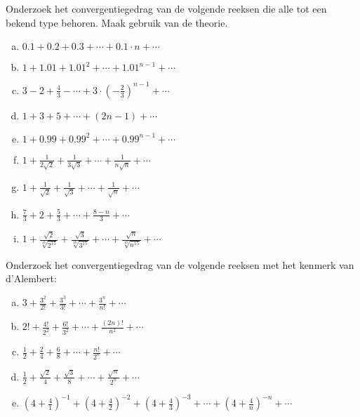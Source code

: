 \documentclass[12pt,twoside]{article}
\begin{document}
\begin{oefening}
Onderzoek het convergentiegedrag van de volgende reeksen die alle tot een bekend type behoren. Maak gebruik van de theorie.
\begin{enumerate}[(a)]
  \item $0.1 + 0.2 + 0.3 + \cdots + 0.1\cdot n + \cdots$
  \item $1 + 1.01 + 1.01^2 + \cdots + 1.01^{n-1} + \cdots$
  \item $3 - 2 + \frac{4}{3} - \cdots + 3\cdot\left(-\frac{2}{3}\right)^{n-1}+ \cdots$
  \item $1 + 3 + 5 + \cdots + (2n-1) + \cdots$
  \item $1 + 0.99 + 0.99^2 + \cdots + 0.99^{n-1} + \cdots$
  \item $1 + \frac{1}{2\sqrt{2}} + \frac{1}{3\sqrt{3}} + \cdots + \frac{1}{n\sqrt{n}} + \cdots$
  \item $1 + \frac{1}{\sqrt{2}} + \frac{1}{\sqrt{3}} + \cdots + \frac{1}{\sqrt{n}} + \cdots$
  \item $\frac{7}{3} + 2 + \frac{5}{3} + \cdots + \frac{8-n}{3} + \cdots$
  \item $1 + \frac{\sqrt{2}}{\sqrt[10]{2^{15}}} + \frac{\sqrt{3}}{\sqrt[10]{3^{15}}} + \cdots + \frac{\sqrt{n}}{\sqrt[10]{n^{15}}} + \cdots$
\end{enumerate}
\end{oefening}

\begin{oefening}
Onderzoek het convergentiegedrag van de volgende reeksen met het kenmerk van d'Alembert:
\begin{enumerate}[(a)]
  \item $3 + \frac{3^2}{2!} + \frac{3^3}{3!} + \cdots + \frac{3^n}{n!} + \cdots$
  \item $2! + \frac{4!}{2^2} + \frac{6!}{3^2} + \cdots + \frac{(2n)!}{n^2} + \cdots$
  \item $\frac{1}{2} + \frac{2}{4} + \frac{6}{8} + \cdots + \frac{n!}{2^n} + \cdots$
  \item $\frac{1}{2} + \frac{\sqrt{2}}{4} + \frac{\sqrt{3}}{8} + \cdots + \frac{\sqrt{n}}{2^n} + \cdots$
  \item $(4 + \frac{4}{1})^{-1} + (4 + \frac{4}{2})^{-2} + (4 + \frac{4}{3})^{-3} + \cdots + (4 + \frac{4}{n})^{-n} + \cdots$
\end{enumerate}
\end{oefening}
\end{document}
